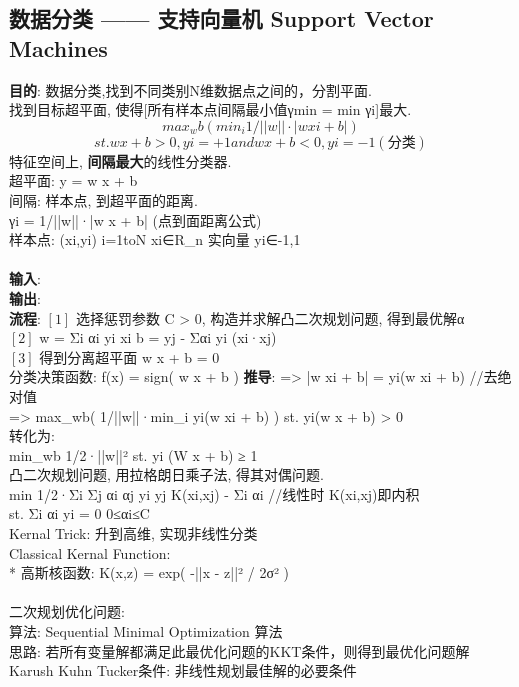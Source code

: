 \documentclass{article}
\begin{document}
\subsection{数据分类 —— 支持向量机 Support Vector Machines }
\textbf{目的}: 数据分类,找到不同类别N维数据点之间的，分割平面.\\
找到目标超平面, 使得[所有样本点间隔最小值γmin = min γi]最大.\\
$$ max_wb( min_i 1/||w||·|w xi + b| ) $$
$$ st.  w x + b > 0 , yi = +1  and  w x + b < 0 , yi = -1  (分类) $$
特征空间上, \textbf{间隔最大}的线性分类器.\\
超平面: y = w x + b\\
间隔: 样本点, 到超平面的距离.\\
        γi = 1/||w||·|w x + b|	(点到面距离公式)\\
样本点: {(xi,yi)} i=1toN    xi∈R_n 实向量    yi∈{-1,1}\\
\\
\textbf{输入}: \\
\textbf{输出}: \\
\textbf{流程}:
$[1]$ 选择惩罚参数 C > 0, 构造并求解凸二次规划问题, 得到最优解α\\
$[2]$ w = Σi αi yi xi    b = yj - Σαi yi (xi·xj)\\
$[3]$ 得到分离超平面 w x + b = 0\\
    分类决策函数: f(x) = sign( w x + b )
\textbf{推导}:
=>	|w xi + b| = yi(w xi + b)		//去绝对值\\
=>	max_wb( 1/||w||·min_i yi(w xi + b) )    st. yi(w x + b) > 0\\
转化为:\\
    min_wb 1/2·||w||²    st. yi (W x + b) ≥ 1\\
    凸二次规划问题, 用拉格朗日乘子法, 得其对偶问题.
\\
    min 1/2·Σi Σj αi αj yi yj K(xi,xj) - Σi αi	//线性时 K(xi,xj)即内积\\
    st. Σi αi yi = 0    0≤αi≤C\\
Kernal Trick: 升到高维, 实现非线性分类\\
Classical Kernal Function:\\
    * 高斯核函数: K(x,z) = exp( -||x - z||² / 2σ² )\\
\\
二次规划优化问题:\\
算法: Sequential Minimal Optimization 算法\\
思路: 若所有变量解都满足此最优化问题的KKT条件，则得到最优化问题解\\
Karush Kuhn Tucker条件: 非线性规划最佳解的必要条件
\end{document}
